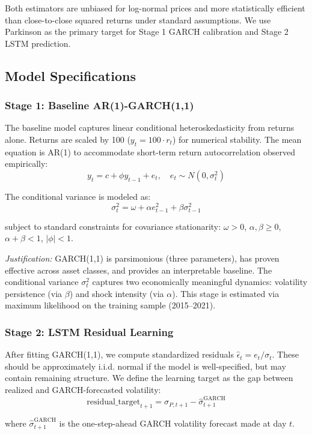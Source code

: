 Both estimators are unbiased for log-normal prices and more statistically efficient than close-to-close squared returns under standard assumptions. We use Parkinson as the primary target for Stage 1 GARCH calibration and Stage 2 LSTM prediction.

\subsection{Model Specifications}

\subsubsection{Stage 1: Baseline AR(1)-GARCH(1,1)}

The baseline model captures linear conditional heteroskedasticity from returns alone. Returns are scaled by 100 ($y_t = 100 \cdot r_t$) for numerical stability. The mean equation is AR(1) to accommodate short-term return autocorrelation observed empirically:
$$y_t = c + \phi y_{t-1} + e_t, \quad e_t \sim N(0, \sigma_t^2)$$

The conditional variance is modeled as:
$$\sigma_t^2 = \omega + \alpha e_{t-1}^2 + \beta \sigma_{t-1}^2$$

subject to standard constraints for covariance stationarity: $\omega > 0$, $\alpha, \beta \geq 0$, $\alpha + \beta < 1$, $|\phi| < 1$.

\textit{Justification:} GARCH(1,1) is parsimonious (three parameters), has proven effective across asset classes, and provides an interpretable baseline. The conditional variance $\sigma_t^2$ captures two economically meaningful dynamics: volatility persistence (via $\beta$) and shock intensity (via $\alpha$). This stage is estimated via maximum likelihood on the training sample (2015--2021).

\subsubsection{Stage 2: LSTM Residual Learning}

After fitting GARCH(1,1), we compute standardized residuals $\hat{\epsilon}_t = e_t / \sigma_t$. These should be approximately i.i.d. normal if the model is well-specified, but may contain remaining structure. We define the learning target as the gap between realized and GARCH-forecasted volatility:
$$\text{residual\_target}_{t+1} = \sigma_{P, t+1} - \hat{\sigma}_{t+1}^{\text{GARCH}}$$

where $\hat{\sigma}_{t+1}^{\text{GARCH}}$ is the one-step-ahead GARCH volatility forecast made at day $t$.

